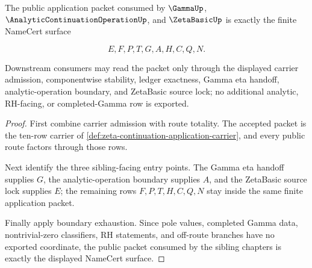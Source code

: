 

\begin{theorem}
\label{thm:zeta-continuation-application-public-export}
The public application packet consumed by $\GammaUp$, $\AnalyticContinuationOperationUp$, and $\ZetaBasicUp$ is exactly the finite NameCert surface

$$
E,F,P,T,G,A,H,C,Q,N.
$$

Downstream consumers may read the packet only through the displayed carrier admission, componentwise stability, ledger exactness, Gamma eta handoff, analytic-operation boundary, and ZetaBasic source lock; no additional analytic, RH-facing, or completed-Gamma row is exported.
\end{theorem}
\begin{proof}
First combine carrier admission with route totality. The accepted packet is the ten-row carrier of \autoref{def:zeta-continuation-application-carrier}, and every public route factors through those rows.

Next identify the three sibling-facing entry points. The Gamma eta handoff supplies $G$, the analytic-operation boundary supplies $A$, and the ZetaBasic source lock supplies $E$; the remaining rows $F,P,T,H,C,Q,N$ stay inside the same finite application packet.

Finally apply boundary exhaustion. Since pole values, completed Gamma data, nontrivial-zero classifiers, RH statements, and off-route branches have no exported coordinate, the public packet consumed by the sibling chapters is exactly the displayed NameCert surface.
\end{proof}

